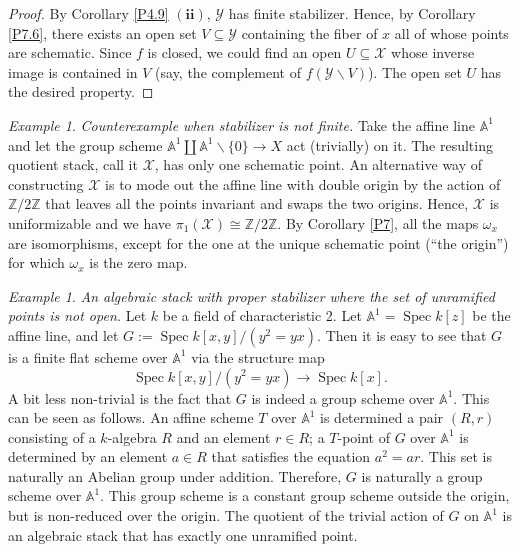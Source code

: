 \documentclass{amsart}
\theoremstyle{definition}
\theoremstyle{remark}
\theoremstyle{remark}
\newtheorem{ex}[thm]{Example}
\newcommand{\X}{\mathcal{X}}
\newcommand{\Y}{\mathcal{Y}}
\newcommand{\ox}{\omega_x}
\newcommand{\Spec}{\operatorname{Spec}}
\begin{document}
\begin{proof}
By Corollary \ref{P4.9} $(\mathbf{ii})$, $\Y$ has finite
stabilizer. Hence, by Corollary \ref{P7.6}, there exists an open
set $V \subseteq \Y$ containing the fiber of $x$ all of whose
points are schematic. Since $f$ is closed, we could find an open
$U \subseteq \X$ whose inverse image is contained in $V$ (say, the
complement of $f(\Y \backslash V)$). The open set $U$ has the
desired property.
\end{proof}

\begin{ex}{\label{E:1}}{\it Counterexample when
stabilizer is not finite.} Take the affine line $\mathbb{A}^1$ and
let the group scheme $\mathbb{A}^1 \coprod \mathbb{A}^1 \backslash
\{0\} \to X$ act (trivially) on it. The resulting quotient stack,
call it $\X$, has only one schematic point. An alternative way of
constructing $\X$ is to mode out the affine line with double
origin by the action of $\mathbb{Z}/2\mathbb{Z}$ that leaves all
the points invariant and swaps the two origins. Hence, $\X$ is
uniformizable and we have $\pi_1(\X) \cong
\mathbb{Z}/2\mathbb{Z}$. By Corollary \ref{P7}, all the maps $\ox$
are isomorphisms, except for the one at the unique schematic point
(``the origin'') for which $\ox$ is the zero map.
\end{ex}

\begin{ex}{\label{E:2}}{\it An algebraic stack with proper
stabilizer where the set of unramified points is not open.} Let
$k$ be a field of characteristic 2. Let $\mathbb{A}^1=\Spec k[z]$
be the affine line, and let $G:=\Spec k[x,y]/{(y^2=yx)}$. Then it
is easy to see that $G$ is a finite flat scheme over
$\mathbb{A}^1$ via the structure map $$\Spec k[x,y]/{(y^2=yx)}
\to     \Spec k[x].$$ A bit less non-trivial is the fact that $G$
is indeed a group scheme over  $\mathbb{A}^1$. This can be seen as
follows. An affine scheme $T$ over $\mathbb{A}^1$ is determined a
pair $(R,r)$ consisting of a $k$-algebra $R$ and an element $r \in
R$; a $T$-point of $G$ over $\mathbb{A}^1$ is determined by an
element $a \in R$ that satisfies the equation $a^2=ar$. This set
is naturally an Abelian group under addition. Therefore, $G$ is
naturally a group scheme over $\mathbb{A}^1$. This group scheme is
a constant group scheme outside the origin, but is non-reduced
over the origin. The quotient of the trivial  action of $G$ on
$\mathbb{A}^1$ is an algebraic stack that has exactly one
unramified point.
\end{ex}
\end{document}
